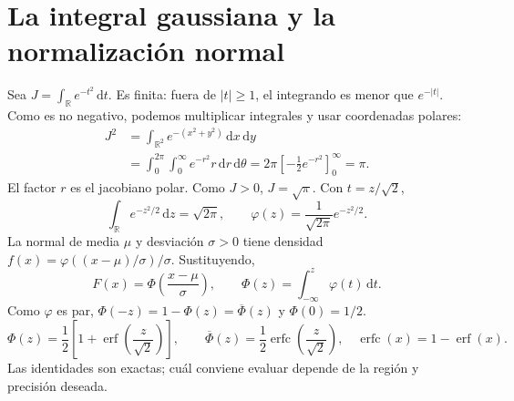 \documentclass[11pt,a4paper]{article}
\newcommand{\R}{\mathbb R}
\newcommand{\dd}{\,\mathrm d}
\theoremstyle{definition}
\DeclareMathOperator{\erf}{erf}
\DeclareMathOperator{\erfc}{erfc}
\newcommand{\ph}{\varphi}
\newcommand{\Q}{\overline\Phi}
\begin{document}
\section{La integral gaussiana y la normalización normal}
Sea $J=\int_\R e^{-t^2}\dd t$. Es finita: fuera de $|t|\ge1$, el integrando es menor que $e^{-|t|}$. Como es no negativo, podemos multiplicar integrales y usar coordenadas polares:
\begin{align*}
J^2&=\int_{\R^2}e^{-(x^2+y^2)}\dd x\dd y\\
&=\int_0^{2\pi}\int_0^\infty e^{-r^2}r\dd r\dd\theta
=2\pi\left[-\frac12e^{-r^2}\right]_0^\infty=\pi.
\end{align*}
El factor $r$ es el jacobiano polar. Como $J>0$, $J=\sqrt\pi$. Con $t=z/\sqrt2$,
\[
\int_\R e^{-z^2/2}\dd z=\sqrt{2\pi},\qquad
\ph(z)=\frac1{\sqrt{2\pi}}e^{-z^2/2}.
\]
La normal de media $\mu$ y desviación $\sigma>0$ tiene densidad
$f(x)=\ph((x-\mu)/\sigma)/\sigma$. Sustituyendo,
\[
F(x)=\Phi\left(\frac{x-\mu}{\sigma}\right),\qquad
\Phi(z)=\int_{-\infty}^z\ph(t)\dd t.
\]
Como $\ph$ es par, $\Phi(-z)=1-\Phi(z)=\Q(z)$ y $\Phi(0)=1/2$.
\[
\Phi(z)=\frac12\left[1+\erf\left(\frac z{\sqrt2}\right)\right],
\qquad \Q(z)=\frac12\erfc\left(\frac z{\sqrt2}\right),\quad
\erfc(x)=1-\erf(x).
\]
Las identidades son exactas; cuál conviene evaluar depende de la región y precisión deseada.
\end{document}
